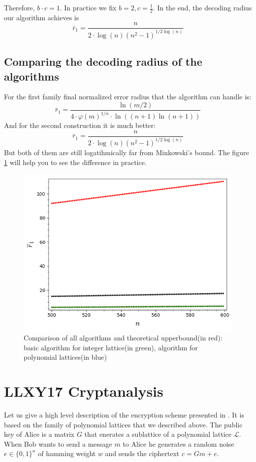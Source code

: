 \documentclass[12pt]{article}
\newcommand{\LL}{\mathcal{L}}
\begin{document}
Therefore, $b \cdot c = 1$. In practice we fix $b = 2, c = \frac{1}{2}$. In the end, the decoding radius our algorithm achieves is
\[
    \bar{r}_1 = \frac{n}{2 \cdot \log(n)(n^{2} - 1)^{1/2\log(n)}}
\]

\subsection{Comparing the decoding radius of the algorithms}
\label{sec:comparison}

For the first family final normalized error radius that the algorithm can handle is:
\[
    \bar{r}_1 = \frac{\ln(m/2)}{4 \cdot \varphi(m)^{1/n} \cdot \ln((n+1)\ln(n+1))}
\]
And for the second construction it is much better:
\[
    \bar{r}_1 = \frac{n}{2 \cdot \log(n)(n^{2} - 1)^{1/2\log(n)}}
\]
But both of them are still logatihmically far from Minkowski's bound. The figure \ref{fig:everything} will help you to see the difference in practice.

\begin{figure}
  \includegraphics[width=\linewidth]{plot5.png}
  \caption{Comparison of all algorithms and theoretical upperbound(in red): basic algorithm for integer lattice(in green), algorithm for polynomial lattices(in blue)}
  \label{fig:everything}
\end{figure}

\section{LLXY17 Cryptanalysis}
\label{sec:cryptanalysis}

Let us give a high level description of the encryption scheme presented in \cite{[LLXY17]}. It is based on the family of polynomial lattices that we described above. The public key of Alice is a matrix $G$ that enerates a sublattice of a polynomial lattice $\LL$. When Bob wants to send a message $m$ to Alice he generates a random noise $ e \in \{0,1\}^{n}$ of hamming weight $w$ and sends the ciphertext $c = Gm + e$.
\end{document}
